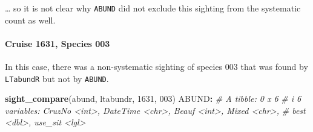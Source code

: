 \documentclass[
]{book}
\newenvironment{Shaded}{\begin{snugshade}}{\end{snugshade}}
\newcommand{\CommentTok}[1]{\textcolor[rgb]{0.56,0.35,0.01}{\textit{#1}}}
\newcommand{\DecValTok}[1]{\textcolor[rgb]{0.00,0.00,0.81}{#1}}
\newcommand{\FunctionTok}[1]{\textcolor[rgb]{0.13,0.29,0.53}{\textbf{#1}}}
\newcommand{\NormalTok}[1]{#1}
\newcommand{\SpecialCharTok}[1]{\textcolor[rgb]{0.81,0.36,0.00}{\textbf{#1}}}
\newcommand{\StringTok}[1]{\textcolor[rgb]{0.31,0.60,0.02}{#1}}
\begin{document}
\ldots{} so it is not clear why \texttt{ABUND} did not exclude this sighting from the systematic count as well.

\hypertarget{cruise-1631-species-003}{%
\paragraph*{Cruise 1631, Species 003}\label{cruise-1631-species-003}}

In this case, there was a non-systematic sighting of species 003 that was found by \texttt{LTabundR} but not by \texttt{ABUND}.

\begin{Shaded}
\begin{Highlighting}[]
\FunctionTok{sight\_compare}\NormalTok{(abund, ltabundr, }\DecValTok{1631}\NormalTok{, }\StringTok{\textquotesingle{}003\textquotesingle{}}\NormalTok{)}
\NormalTok{ABUND}\SpecialCharTok{:}
\CommentTok{\# A tibble: 0 x 6}
\CommentTok{\# i 6 variables: CruzNo \textless{}int\textgreater{}, DateTime \textless{}chr\textgreater{}, Beauf \textless{}int\textgreater{}, Mixed \textless{}chr\textgreater{},}
\CommentTok{\#   best \textless{}dbl\textgreater{}, use\_sit \textless{}lgl\textgreater{}}


\end{Highlighting}
\end{Shaded}
\end{document}
